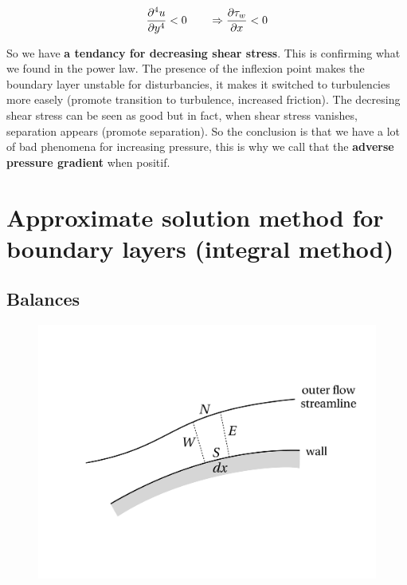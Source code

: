 	\begin{equation}
		\frac{\D ^4 u}{\D y^4} <0 \qquad \Rightarrow \frac{\D \tau _w}{\D x} < 0
	\end{equation}
			
	So we have \textbf{a tendancy for decreasing shear stress}. This is confirming what we found in the power law. The presence of the inflexion point makes the boundary layer unstable for disturbancies, it makes it switched to turbulencies more easely (promote transition to turbulence, increased friction). The decresing shear stress can be seen as good but in fact, when shear stress vanishes, separation appears (promote separation). So the conclusion is that we have a lot of bad phenomena for increasing pressure, this is why we call that the \textbf{adverse pressure gradient} when positif. 
	

\section{Approximate solution method for boundary layers (integral method)}
\subsection{Balances}

\begin{figure}
\vspace{-5mm}
\includegraphics[scale=0.2]{ch5/16}
\end{figure}


